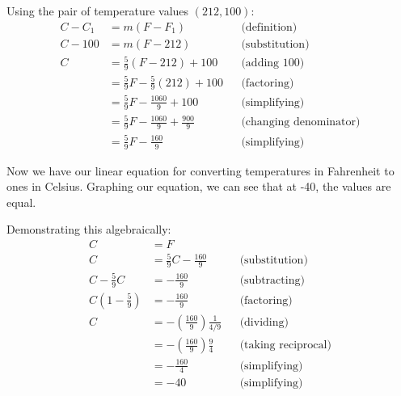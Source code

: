 \begin{homework}
\begin{solution}
        Using the pair of temperature values $ (212, 100) $:
        \begin{align*}
            C - C_1 &= m(F - F_1)
                &&\text{(definition)}\\
            C - 100 &= m(F - 212)
                &&\text{(substitution)}\\
            C &= \frac{5}{9}(F - 212) + 100
                &&\text{(adding $100$)}\\
              &= \frac{5}{9}F - \frac{5}{9}(212) + 100
                &&\text{(factoring)}\\
              &= \frac{5}{9}F - \frac{1060}{9} + 100
                &&\text{(simplifying)}\\
              &= \frac{5}{9}F - \frac{1060}{9} + \frac{900}{9}
                &&\text{(changing denominator)}\\
              &= \frac{5}{9}F - \frac{160}{9}
                &&\text{(simplifying)}
        \end{align*}

        Now we have our linear equation for converting temperatures in Fahrenheit to ones in Celsius.
        Graphing our equation, we can see that at -40, the values are equal.


        Demonstrating this algebraically:
        \begin{align*}
            C &= F\\
            C &= \frac{5}{9} C - \frac{160}{9}
                &&\text{(substitution)}\\
            C - \frac{5}{9} C &= - \frac{160}{9}
                &&\text{(subtracting)}\\
            C (1 - \frac{5}{9}) &= - \frac{160}{9}
                &&\text{(factoring)}\\
            C &= - \left( \frac{160}{9} \right)\frac{1}{4/9}
                &&\text{(dividing)}\\
              &= - \left( \frac{160}{9} \right)\frac{9}{4}
                &&\text{(taking reciprocal)}\\
              &= - \frac{160}{4}
                &&\text{(simplifying)}\\
              &= - 40
                &&\text{(simplifying)}
        \end{align*}
        

\end{solution}
\end{homework}
